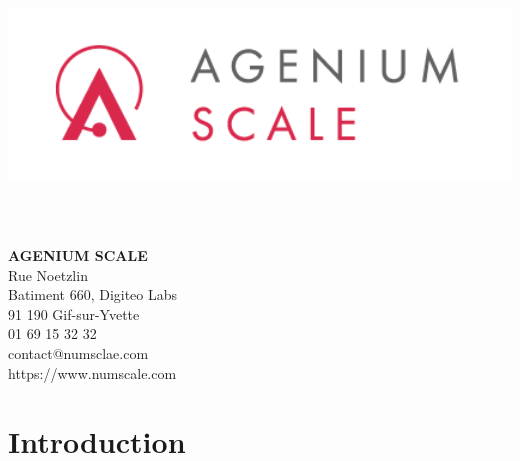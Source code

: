 
\usepackage{listings}
\usepackage{algorithm}
\usepackage{amsmath} 
\usepackage{algorithmic}
\usepackage{array,multirow,makecell}
\usepackage[table]{xcolor}

\usepackage[T1]{fontenc}
\usepackage[utf8]{inputenc}
\usepackage{multicol}


\usepackage{fancyhdr}
\pagestyle{fancy}
\renewcommand{\headrulewidth}{0pt}
\renewcommand{\footrulewidth}{0pt}


\title{\includegraphics[width=27em]{tex/scale.png}\\ }

\maketitle
\vspace{10em}
\textbf{AGENIUM SCALE}\\
Rue Noetzlin\\
Batiment 660, Digiteo Labs\\
91 190 Gif-sur-Yvette\\
01 69 15 32 32 \\
contact@numsclae.com\\
https://www.numscale.com\\

\clearpage
{}

\begin{flushright}\textit{}\end{flushright}


\tableofcontents
\newpage
\section{Introduction} %
